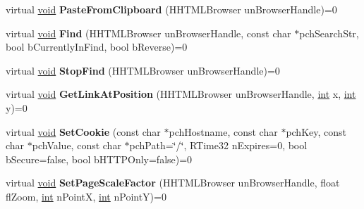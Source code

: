 \begin{DoxyCompactItemize}
\item 
\hypertarget{classISteamHTMLSurface_a8923f897b61da1a9f04aecf318581b31}{}virtual \hyperlink{SDL__audio_8h_a52835ae37c4bb905b903cbaf5d04b05f}{void} {\bfseries Paste\+From\+Clipboard} (H\+H\+T\+M\+L\+Browser un\+Browser\+Handle)=0\label{classISteamHTMLSurface_a8923f897b61da1a9f04aecf318581b31}

\item 
\hypertarget{classISteamHTMLSurface_a22fdef649c5e93065f6ac45a23c30530}{}virtual \hyperlink{SDL__audio_8h_a52835ae37c4bb905b903cbaf5d04b05f}{void} {\bfseries Find} (H\+H\+T\+M\+L\+Browser un\+Browser\+Handle, const char $\ast$pch\+Search\+Str, bool b\+Currently\+In\+Find, bool b\+Reverse)=0\label{classISteamHTMLSurface_a22fdef649c5e93065f6ac45a23c30530}

\item 
\hypertarget{classISteamHTMLSurface_afaf9dd99a4f51d7ad77620ba0a3d01df}{}virtual \hyperlink{SDL__audio_8h_a52835ae37c4bb905b903cbaf5d04b05f}{void} {\bfseries Stop\+Find} (H\+H\+T\+M\+L\+Browser un\+Browser\+Handle)=0\label{classISteamHTMLSurface_afaf9dd99a4f51d7ad77620ba0a3d01df}

\item 
\hypertarget{classISteamHTMLSurface_aa98e035eb1ea88e31152dee37778a2d9}{}virtual \hyperlink{SDL__audio_8h_a52835ae37c4bb905b903cbaf5d04b05f}{void} {\bfseries Get\+Link\+At\+Position} (H\+H\+T\+M\+L\+Browser un\+Browser\+Handle, \hyperlink{SDL__thread_8h_a6a64f9be4433e4de6e2f2f548cf3c08e}{int} x, \hyperlink{SDL__thread_8h_a6a64f9be4433e4de6e2f2f548cf3c08e}{int} y)=0\label{classISteamHTMLSurface_aa98e035eb1ea88e31152dee37778a2d9}

\item 
\hypertarget{classISteamHTMLSurface_a096761fa5e8192de18bd2b01eb1a4736}{}virtual \hyperlink{SDL__audio_8h_a52835ae37c4bb905b903cbaf5d04b05f}{void} {\bfseries Set\+Cookie} (const char $\ast$pch\+Hostname, const char $\ast$pch\+Key, const char $\ast$pch\+Value, const char $\ast$pch\+Path=\char`\"{}/\char`\"{}, R\+Time32 n\+Expires=0, bool b\+Secure=false, bool b\+H\+T\+T\+P\+Only=false)=0\label{classISteamHTMLSurface_a096761fa5e8192de18bd2b01eb1a4736}

\item 
\hypertarget{classISteamHTMLSurface_ad0ac9b5af995492c4f86df37744931de}{}virtual \hyperlink{SDL__audio_8h_a52835ae37c4bb905b903cbaf5d04b05f}{void} {\bfseries Set\+Page\+Scale\+Factor} (H\+H\+T\+M\+L\+Browser un\+Browser\+Handle, float fl\+Zoom, \hyperlink{SDL__thread_8h_a6a64f9be4433e4de6e2f2f548cf3c08e}{int} n\+Point\+X, \hyperlink{SDL__thread_8h_a6a64f9be4433e4de6e2f2f548cf3c08e}{int} n\+Point\+Y)=0\label{classISteamHTMLSurface_ad0ac9b5af995492c4f86df37744931de}


\end{DoxyCompactItemize}

